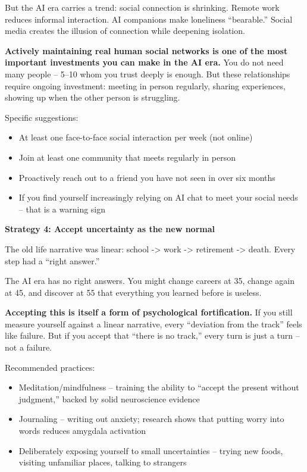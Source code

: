 \documentclass[11pt,a4paper]{article}
\begin{document}
But the AI era carries a trend: social connection is shrinking. Remote work reduces informal interaction. AI companions make loneliness ``bearable.'' Social media creates the illusion of connection while deepening isolation.

\textbf{Actively maintaining real human social networks is one of the most important investments you can make in the AI era.} You do not need many people -- 5--10 whom you trust deeply is enough. But these relationships require ongoing investment: meeting in person regularly, sharing experiences, showing up when the other person is struggling.

Specific suggestions:

\begin{itemize}
  \item At least one face-to-face social interaction per week (not online)
  \item Join at least one community that meets regularly in person
  \item Proactively reach out to a friend you have not seen in over six months
  \item If you find yourself increasingly relying on AI chat to meet your social needs -- that is a warning sign
\end{itemize}

\textbf{Strategy 4: Accept uncertainty as the new normal}

The old life narrative was linear: school -> work -> retirement -> death. Every step had a ``right answer.''

The AI era has no right answers. You might change careers at 35, change again at 45, and discover at 55 that everything you learned before is useless.

\textbf{Accepting this is itself a form of psychological fortification.} If you still measure yourself against a linear narrative, every ``deviation from the track'' feels like failure. But if you accept that ``there is no track,'' every turn is just a turn -- not a failure.

Recommended practices:

\begin{itemize}
  \item Meditation/mindfulness -- training the ability to ``accept the present without judgment,'' backed by solid neuroscience evidence
  \item Journaling -- writing out anxiety; research shows that putting worry into words reduces amygdala activation
  \item Deliberately exposing yourself to small uncertainties -- trying new foods, visiting unfamiliar places, talking to strangers
\end{itemize}
\end{document}
